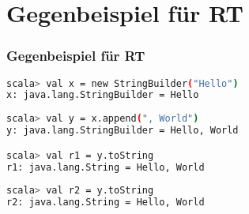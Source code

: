 	\section[Section]{Gegenbeispiel für RT}
	\begin{frame}[fragile]
		\frametitle{Gegenbeispiel für RT}
		\begin{lstlisting}[language=bash]
scala> val x = new StringBuilder("Hello")
x: java.lang.StringBuilder = Hello 
	
scala> val y = x.append(", World") 
y: java.lang.StringBuilder = Hello, World 

scala> val r1 = y.toString 
r1: java.lang.String = Hello, World 
		
scala> val r2 = y.toString 
r2: java.lang.String = Hello, World 
\end{lstlisting}	
\end{frame}